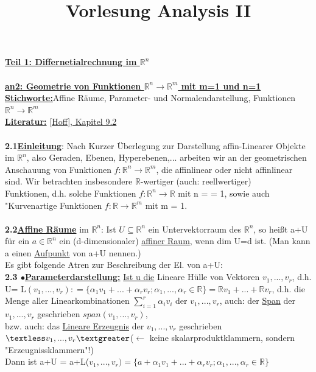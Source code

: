 \documentclass[]{scrartcl}
\title{Vorlesung Analysis II}
\begin{document}
\maketitle
\textbf{\underline{Teil 1: Differnetialrechnung im $\mathbb{R}^n$}}\\
\\
\textbf{\underline{an2: Geometrie von Funktionen 
$\mathbb{R}^n\rightarrow\mathbb{R}^m$ 
mit m=1 und n=1}}\\
\textbf{\underline{Stichworte:}}Affine Räume, Parameter- und 
Normalendarstellung, 
Funktionen 
$\mathbb{R}^n\rightarrow\mathbb{R}^m$\\
\textbf{\underline{Literatur:}} \ul{[Hoff], Kapitel 9.2}\\
\\
\textbf{2.1}\underline{\textbf{Einleitung}}: Nach Kurzer Überlegung zur 
Darstellung 
affin-Linearer Objekte im $\mathbb{R}^n$, also Geraden, Ebenen, Hyperebenen,... 
arbeiten wir an der geometrischen Anschauung von Funktionen 
$f:\mathbb{R}^n\rightarrow\mathbb{R}^m$, die affinlinear oder nicht affinlinear 
sind. Wir betrachten insbesondere $\mathbb{R}$-wertiger (auch: reellwertiger)\\
Funktionen, d.h. solche Funktionen $f:\mathbb{R}^n\rightarrow\mathbb{R}$ mit n 
= = 1, sowie auch "Kurvenartige Funktionen $f: 
\mathbb{R}\rightarrow\mathbb{R}^m$ mit m = 1.\\\\
\textbf{2.2\underline{Affine Räume}} im $\mathbb{R}^n$: Ist 
$U\subseteq\mathbb{R}^n$ ein 
Untervektorraum des $\mathbb{R}^n$, so heißt a+U für ein $a\in \mathbb{R}^n$ 
ein (d-dimensionaler)  \ul{affiner Raum}, wenn dim U=d ist. 
(Man kann a einen \ul{Aufpunkt} von a+U nennen.)\\
Es gibt folgende Atren zur Beschreibung der El. von a+U:\\
\textbf{2.3 $\bullet$\underline{Parameterdarstellung:}} \ul{Ist u die} Lineare 
Hülle von 
Vektoren $v_1,...,v_r$, d.h. U= L$(v_1,...,v_r) : = \{\alpha_1 v_1+...+\alpha_r 
v_r; \alpha_1,...,\alpha_r\in\mathbb{R}\} = \mathbb{R}v_1+...+\mathbb{R}v_r$, 
d.h. die Menge aller Linearkombinationen $\sum_{i=1}^{r}\alpha_i v_i$ der 
$v_1,...,v_r$, auch: der \ul{Span} der $v_1,...,v_r$ geschrieben 
 \ul{$span(v_1,...,v_r)$},\\
bzw. auch: das  \ul{Lineare Erzeugnis} der $v_1,...,v_r$ 
geschrieben$\textless v_1,...,v_r\textgreater$($\leftarrow$ keine 
skalarproduktklammern, sondern "Erzeugnissklammern"!)\\
Dann ist a+U = a+L($v_1,...,v_r) = \{a+\alpha_1 v_1 +...+ \alpha_r v_r; 
\alpha_1,...,\alpha_r\in \mathbb{R}\}$\\
\end{document}
